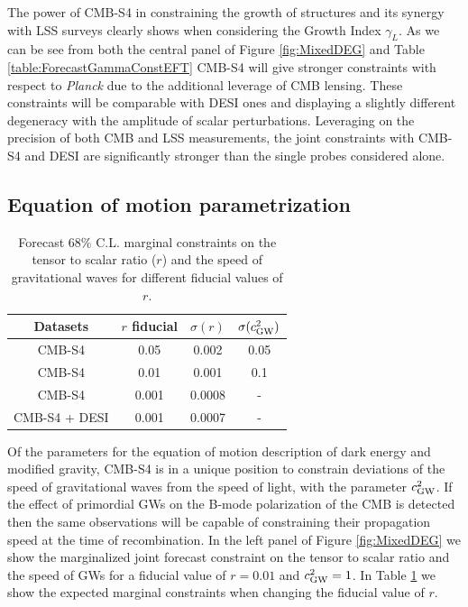 The power of CMB-S4 in constraining the growth of structures and its synergy with LSS surveys clearly shows when considering the Growth Index $\gamma_{L}$. As we can be see from both the central panel of Figure \ref{fig:MixedDEG} and Table \ref{table:ForecastGammaConstEFT} CMB-S4 will give stronger constraints with respect to {\it Planck} due to the additional leverage of CMB lensing. These constraints will be comparable with DESI ones and displaying a slightly different degeneracy with the amplitude of scalar perturbations.
Leveraging on the precision of both CMB and LSS measurements, the joint constraints with CMB-S4 and DESI are significantly stronger than the single probes considered alone.

\subsection{Equation of motion parametrization}

\begin{table}[t!]
\begin{center}
\begin{tabular}{|c|c|c|c|} 
\hline
Datasets 			&  $r$ fiducial & $\sigma ( r )$  & $\sigma ( c_{\rm GW}^2 )$ \\
\hline
\hline
CMB-S4               & 0.05 & 0.002 & 0.05 \\
\hline
CMB-S4               & 0.01 & 0.001 & 0.1 \\
\hline
CMB-S4               & 0.001 & 0.0008 & - \\
\hline
CMB-S4 + DESI     & 0.001 & 0.0007 & - \\
\hline
\end{tabular}
\caption{Forecast $68\%$ C.L. marginal constraints on the tensor to scalar ratio ($r$) and the speed of gravitational waves for different fiducial values of $r$.}
\label{table:ForecastCT}
\end{center}
\end{table}
Of the parameters for the equation of motion description of dark energy and modified gravity,  CMB-S4 is in a unique position to 
constrain deviations of the speed of gravitational waves from the speed of light, with the parameter $c^2_{\rm GW}$. If the effect of primordial GWs on the B-mode polarization of the CMB is detected then the same observations will be capable of constraining their propagation speed at the time of recombination.
In the left panel of Figure \ref{fig:MixedDEG} we show the marginalized joint forecast constraint on the tensor to scalar ratio and the speed of GWs for a fiducial value of $r=0.01$ and $c_{\rm GW}^2=1$. In Table \ref{table:ForecastCT} we show the expected marginal constraints when changing the fiducial value of $r$.

